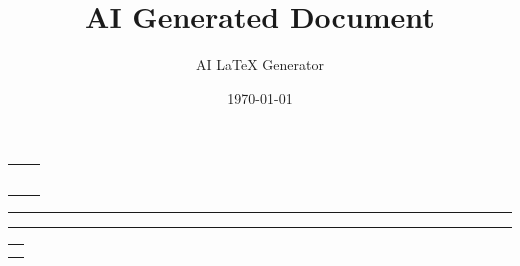 \documentclass[11pt,letterpaper]{article}
\title{AI Generated Document}
\author{AI LaTeX Generator}
\date{\today}
\begin{document}
\maketitle

\begin{center}
\begin{tabular}{rl}
\textbf{} & \\
\textbf{} & \\
\textbf{} & \\
\textbf{} & \\
\textbf{} & \\
\end{tabular}
\end{center}

\vspace{0.5cm}
\noindent\rule{\textwidth}{0.4pt}
\vspace{0.5cm}


\vspace{0.5cm}
\noindent\rule{\textwidth}{0.4pt}
\vspace{0.5cm}


\vspace{1.5cm}

\vspace{0.5cm}

\begin{tabular}{l}
\textbf{} \\
 \\
 
\end{tabular}
\end{document}
